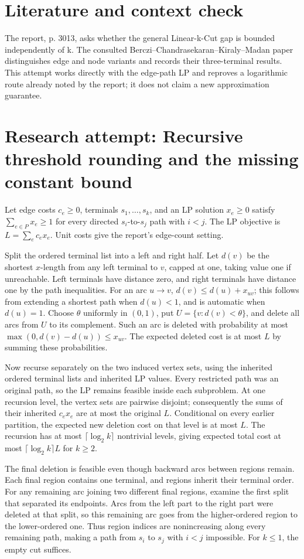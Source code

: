 \documentclass[11pt]{article}
\begin{document}
\section{Literature and context check}
The report, p. 3013, asks whether the general Linear-k-Cut gap is bounded independently of k. The consulted Berczi--Chandrasekaran--Kiraly--Madan paper distinguishes edge and node variants and records their three-terminal results. This attempt works directly with the edge-path LP and reproves a logarithmic route already noted by the report; it does not claim a new approximation guarantee.
\section{Research attempt: Recursive threshold rounding and the missing constant bound}
Let edge costs $c_e\ge0$, terminals $s_1,\ldots,s_k$, and an LP solution $x_e\ge0$ satisfy $\sum_{e\in P}x_e\ge1$ for every directed $s_i$-to-$s_j$ path with $i<j$. The LP objective is $L=\sum_ec_ex_e$. Unit costs give the report's edge-count setting.

Split the ordered terminal list into a left and right half. Let $d(v)$ be the shortest $x$-length from any left terminal to $v$, capped at one, taking value one if unreachable. Left terminals have distance zero, and right terminals have distance one by the path inequalities. For an arc $u\to v$, $d(v)\le d(u)+x_{uv}$; this follows from extending a shortest path when $d(u)<1$, and is automatic when $d(u)=1$. Choose $\theta$ uniformly in $(0,1)$, put $U=\{v:d(v)<\theta\}$, and delete all arcs from $U$ to its complement. Such an arc is deleted with probability at most $\max(0,d(v)-d(u))\le x_{uv}$. The expected deleted cost is at most $L$ by summing these probabilities.

Now recurse separately on the two induced vertex sets, using the inherited ordered terminal lists and inherited LP values. Every restricted path was an original path, so the LP remains feasible inside each subproblem. At one recursion level, the vertex sets are pairwise disjoint; consequently the sums of their inherited $c_ex_e$ are at most the original $L$. Conditional on every earlier partition, the expected new deletion cost on that level is at most $L$. The recursion has at most $\lceil\log_2 k\rceil$ nontrivial levels, giving expected total cost at most $\lceil\log_2 k\rceil L$ for $k\ge2$.

The final deletion is feasible even though backward arcs between regions remain. Each final region contains one terminal, and regions inherit their terminal order. For any remaining arc joining two different final regions, examine the first split that separated its endpoints. Arcs from the left part to the right part were deleted at that split, so this remaining arc goes from the higher-ordered region to the lower-ordered one. Thus region indices are nonincreasing along every remaining path, making a path from $s_i$ to $s_j$ with $i<j$ impossible. For $k\le1$, the empty cut suffices.
\end{document}
